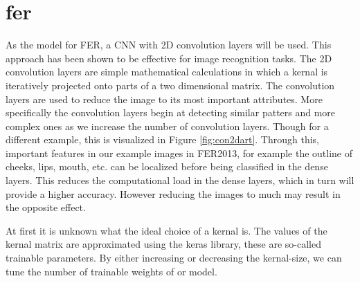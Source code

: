 \section{\acrlong{fer}}
As the model for FER, a CNN with 2D convolution layers will be used. This approach has been shown to be effective for image recognition tasks. 
The 2D convolution layers are simple mathematical calculations in which a kernal is iteratively projected onto parts of a two dimensional matrix.
The convolution layers are used to reduce the image to its most important attributes. More specifically the convolution layers begin at detecting  similar patters and more complex ones as we increase the number of convolution layers. Though for a different example, this is visualized in Figure \ref{fig:con2dart}. Through this, important features in our example images in FER2013, for example the outline of cheeks, lips, mouth, etc. can be localized before being classified in the dense layers. This reduces the computational load in the dense layers, which in turn will provide a higher accuracy. However reducing the images to much may result in the opposite effect. 

At first it is unknown what the ideal choice of a kernal is. The values of the kernal matrix are approximated using the keras library, these are so-called trainable parameters. By either increasing or decreasing the kernal-size, we can tune the number of trainable weights of or model. 

